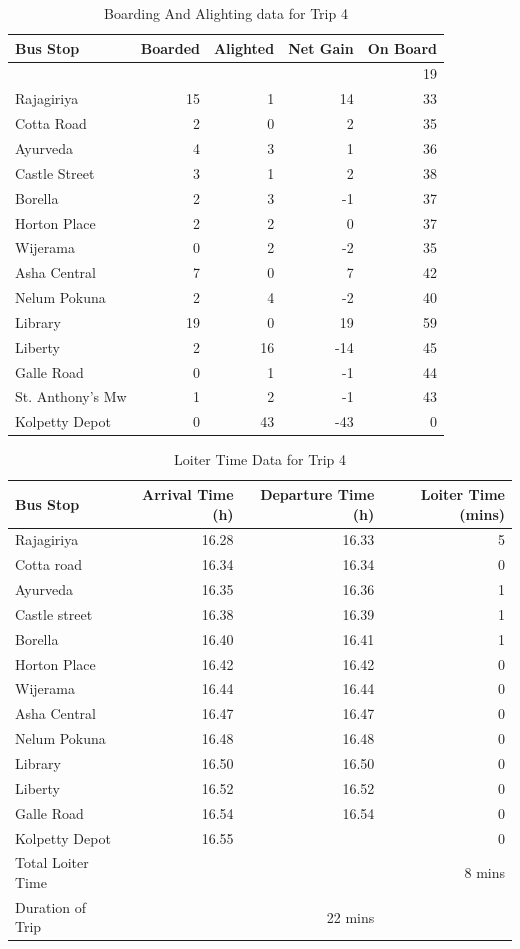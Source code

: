 \documentclass[12pt, oneside]{report}
\begin{document}
\begin{table}
\centering
\begin{tabular}{|l|r|r|r|r|}
\hline
Bus Stop & Boarded & Alighted & Net Gain & On Board \\
\hline
 & & & & 19 \\
Rajagiriya	&15	&1	&14	&33\\
Cotta Road	&2	&0	&2	&35\\
Ayurveda	&4	&3	&1	&36\\
Castle Street	&3	&1	&2	&38\\
Borella	&2	&3	&-1	&37\\
Horton Place	&2	&2	&0	&37\\
Wijerama	&0	&2	&-2	&35\\
Asha Central	&7	&0	&7	&42\\
Nelum Pokuna	&2	&4	&-2	&40\\
Library	&19	&0	&19	&59\\
Liberty	&2	&16	&-14	&45\\
Galle Road	&0	&1	&-1	&44\\
\rowcolor[gray]{0.7}
St. Anthony's Mw	&1	&2	&-1	&43\\
Kolpetty Depot	&0	&43	&-43	&0\\
\hline
\end{tabular}
\caption{Boarding And Alighting data for Trip 4}
\label{table-trip4-BoardingAndAlighting}
\end{table}

\begin{table}
\centering
\begin{tabular}{|l|r|r|r|}
\hline
Bus Stop & Arrival Time (h) & Departure Time (h) & Loiter Time (mins) \\
\hline
Rajagiriya	&16.28	&16.33	&5\\
Cotta road	&16.34	&16.34	&0\\
Ayurveda	&16.35	&16.36	&1\\
Castle street	&16.38	&16.39	&1\\
Borella	&16.40	&16.41	&1\\
Horton Place	&16.42	&16.42	&0\\
Wijerama	&16.44	&16.44	&0\\
Asha Central	&16.47	&16.47	&0\\
Nelum Pokuna	&16.48	&16.48	&0\\
Library	&16.50	&16.50	&0\\
Liberty	&16.52	&16.52	&0\\
Galle Road	&16.54	&16.54	&0\\
Kolpetty Depot	&16.55	&	&0\\
\hline
Total Loiter Time & & & 8 mins \\
Duration of Trip & & 22 mins & \\
\hline
\end{tabular}
\caption{Loiter Time Data for Trip 4}
\label{table-trip4-LoiterTime}
\end{table}
\end{document}
